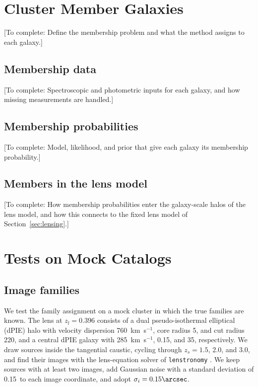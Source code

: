 \documentclass[twocolumn,twocolappendix,linenumbers]{aastex701}
\newcommand{\todo}[1]{\textcolor{red!65!black}{[To complete: #1]}}
\begin{document}
\section{Cluster Member Galaxies}
\label{sec:members}
\todo{Define the membership problem and what the method assigns to each galaxy.}

\subsection{Membership data}
\label{sec:member_data}
\todo{Spectroscopic and photometric inputs for each galaxy, and how missing measurements are handled.}

\subsection{Membership probabilities}
\label{sec:member_probabilities}
\todo{Model, likelihood, and prior that give each galaxy its membership probability.}

\subsection{Members in the lens model}
\label{sec:member_lens}
\todo{How membership probabilities enter the galaxy-scale halos of the lens model, and how this connects to the fixed lens model of Section~\ref{sec:lensing}.}

\section{Tests on Mock Catalogs}
\label{sec:validation}

\subsection{Image families}
\label{sec:test_families}
We test the family assignment on a mock cluster in which the true families are known.
The lens at $z_l=0.396$ consists of a dual pseudo-isothermal elliptical (dPIE) halo \citep{Eliasdottir2007} with velocity dispersion 760~km~s$^{-1}$, core radius 5\arcsec, and cut radius 220\arcsec, and a central dPIE galaxy with 285~km~s$^{-1}$, 0.15\arcsec, and 35\arcsec, respectively.
We draw sources inside the tangential caustic, cycling through $z_s=1.5$, 2.0, and 3.0, and find their images with the lens-equation solver of \texttt{lenstronomy} \citep{Birrer2018}.
We keep sources with at least two images, add Gaussian noise with a standard deviation of 0.15\arcsec\ to each image coordinate, and adopt $\sigma_i=0.15\arcsec$.
\end{document}
